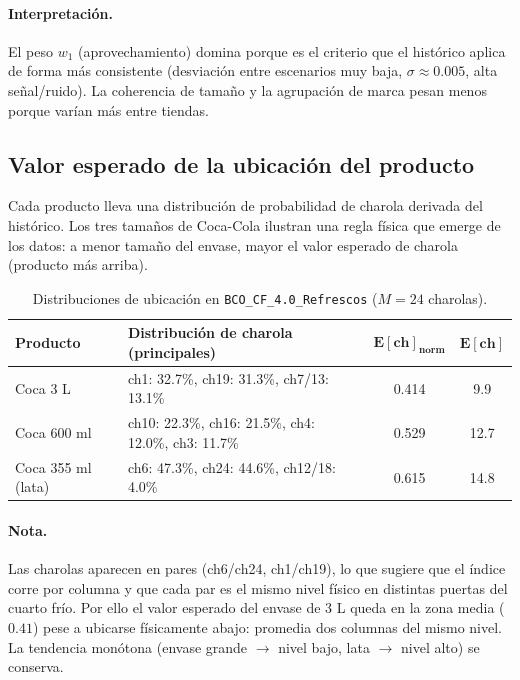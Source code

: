 \documentclass[11pt,letterpaper]{article}
\newcommand{\thead}[1]{\rowcolor{headgray}#1}
\begin{document}
\paragraph{Interpretaci\'on.} El peso $w_1$ (aprovechamiento) domina porque es el
criterio que el hist\'orico aplica de forma m\'as consistente (desviaci\'on entre
escenarios muy baja, $\sigma\approx0.005$, alta se\~nal/ruido). La coherencia de
tama\~no y la agrupaci\'on de marca pesan menos porque var\'ian m\'as entre tiendas.

\subsection{Valor esperado de la ubicaci\'on del producto}
\label{sec:eubic}
Cada producto lleva una distribuci\'on de probabilidad de charola derivada del
hist\'orico. Los tres tama\~nos de Coca-Cola ilustran una regla f\'isica que emerge de
los datos: a menor tama\~no del envase, mayor el valor esperado de charola (producto
m\'as arriba).

\begin{table}[H]
\centering\small
\begin{tabular}{lp{5.8cm}cc}
\toprule
\thead{\textbf{Producto}} & \textbf{Distribuci\'on de charola (principales)} &
$\boldsymbol{E[\text{ch}]_{\text{norm}}}$ & $\boldsymbol{E[\text{ch}]}$ \\
\midrule
Coca 3 L           & ch1: 32.7\%, ch19: 31.3\%, ch7/13: 13.1\% & 0.414 & 9.9 \\
Coca 600 ml        & ch10: 22.3\%, ch16: 21.5\%, ch4: 12.0\%, ch3: 11.7\% & 0.529 & 12.7 \\
Coca 355 ml (lata) & ch6: 47.3\%, ch24: 44.6\%, ch12/18: 4.0\% & 0.615 & 14.8 \\
\bottomrule
\end{tabular}
\caption{Distribuciones de ubicaci\'on en \texttt{BCO\_CF\_4.0\_Refrescos}
($M=24$ charolas).}
\label{tab:eubic}
\end{table}

\paragraph{Nota.} Las charolas aparecen en pares (ch6/ch24, ch1/ch19), lo que sugiere
que el \'indice corre por columna y que cada par es el mismo nivel f\'isico en
distintas puertas del cuarto fr\'io. Por ello el valor esperado del envase de 3 L
queda en la zona media ($0.41$) pese a ubicarse f\'isicamente abajo: promedia dos
columnas del mismo nivel. La tendencia mon\'otona (envase grande $\to$ nivel bajo,
lata $\to$ nivel alto) se conserva.
\end{document}
